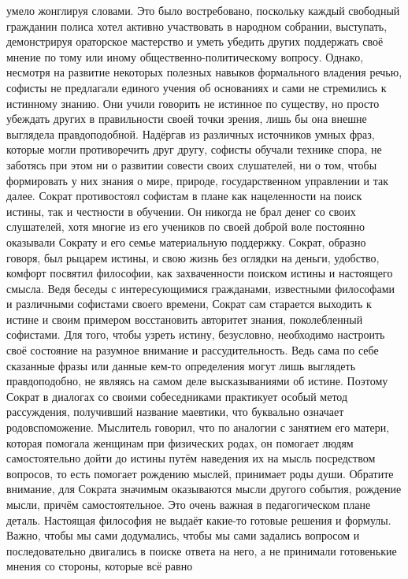 умело жонглируя словами. Это было востребовано, поскольку каждый свободный
гражданин полиса хотел активно участвовать в народном собрании, выступать,
демонстрируя ораторское мастерство и уметь убедить других поддержать своё мнение
по тому или иному общественно-политическому вопросу. Однако, несмотря на
развитие некоторых полезных навыков формального владения речью, софисты не
предлагали единого учения об основаниях и сами не стремились к истинному знанию.
Они учили говорить не истинное по существу, но просто убеждать других в
правильности своей точки зрения, лишь бы она внешне выглядела правдоподобной.
Надёргав из различных источников умных фраз, которые могли противоречить друг
другу, софисты обучали технике спора, не заботясь при этом ни о развитии совести
своих слушателей, ни о том, чтобы формировать у них знания о мире, природе,
государственном управлении и так далее. Сократ противостоял софистам в плане как
нацеленности на поиск истины, так и честности в обучении. Он никогда не брал
денег со своих слушателей, хотя многие из его учеников по своей доброй воле
постоянно оказывали Сократу и его семье материальную поддержку. Сократ, образно
говоря, был рыцарем истины, и свою жизнь без оглядки на деньги, удобство,
комфорт посвятил философии, как захваченности поиском истины и настоящего
смысла. Ведя беседы с интересующимися гражданами, известными философами и
различными софистами своего времени, Сократ сам старается выходить к истине и
своим примером восстановить авторитет знания, поколебленный софистами. Для того,
чтобы узреть истину, безусловно, необходимо настроить своё состояние на разумное
внимание и рассудительность. Ведь сама по себе сказанные фразы или данные кем-то
определения могут лишь выглядеть правдоподобно, не являясь на самом деле
высказываниями об истине. Поэтому Сократ в диалогах со своими собеседниками
практикует особый метод рассуждения, получивший название маевтики, что буквально
означает родовспоможение. Мыслитель говорил, что по аналогии с занятием его
матери, которая помогала женщинам при физических родах, он помогает людям
самостоятельно дойти до истины путём наведения их на мысль посредством вопросов,
то есть помогает рождению мыслей, принимает роды души. Обратите внимание, для
Сократа значимым оказываются мысли другого события, рождение мысли, причём
самостоятельное. Это очень важная в педагогическом плане деталь. Настоящая
философия не выдаёт какие-то готовые решения и формулы. Важно, чтобы мы сами
додумались, чтобы мы сами задались вопросом и последовательно двигались в поиске
ответа на него, а не принимали готовенькие мнения со стороны, которые всё равно
